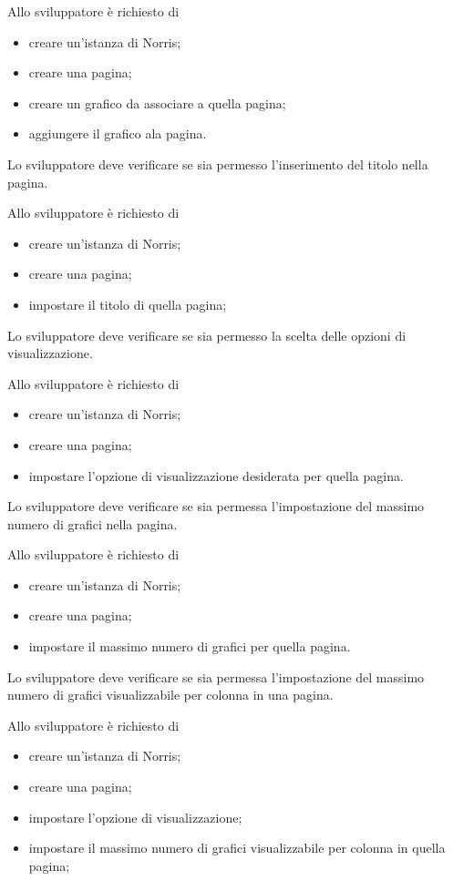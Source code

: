 		Allo sviluppatore è richiesto di
		\begin{itemize}
			\item creare un'istanza di Norris;
			\item creare una pagina;
			\item creare un grafico da associare a quella pagina;
			\item aggiungere il grafico ala pagina.
		\end{itemize}

	Lo sviluppatore deve verificare se sia permesso l'inserimento del titolo nella pagina.
		
		Allo sviluppatore è richiesto di
		\begin{itemize}
			\item creare un'istanza di Norris;
			\item creare una pagina;
			\item impostare il titolo di quella pagina;
		\end{itemize}

	Lo sviluppatore deve verificare se sia permesso la scelta delle opzioni di visualizzazione.
		
		Allo sviluppatore è richiesto di
		\begin{itemize}
			\item creare un'istanza di Norris;
			\item creare una pagina;
			\item impostare l'opzione di visualizzazione desiderata per quella pagina.
		\end{itemize}

	Lo sviluppatore deve verificare se sia permessa l'impostazione del massimo numero di grafici nella pagina.
		
		Allo sviluppatore è richiesto di
		\begin{itemize}
			\item creare un'istanza di Norris;
			\item creare una pagina;
			\item impostare il massimo numero di grafici per quella pagina.
		\end{itemize}

	Lo sviluppatore deve verificare se sia permessa l'impostazione del massimo numero di grafici visualizzabile per colonna in una pagina.
		
		Allo sviluppatore è richiesto di
		\begin{itemize}
			\item creare un'istanza di Norris;
			\item creare una pagina;
			\item impostare l'opzione di visualizzazione;
			\item impostare il massimo numero di grafici visualizzabile per colonna in quella pagina;
		\end{itemize}

